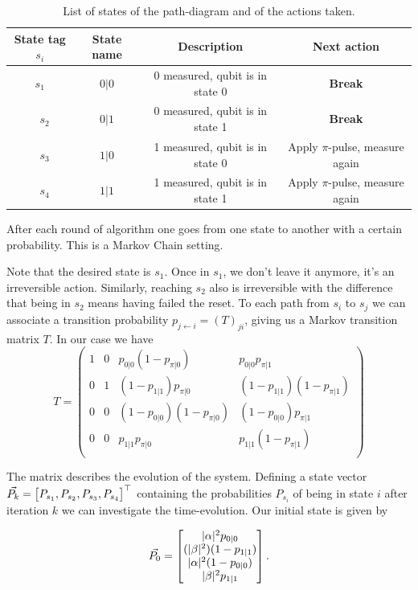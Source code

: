  \begin{table}[h]
     \centering
     \begin{tabular}{c|c|c|c}
        State tag $s_i$ & State name & Description & Next action \\ \hline 
        $s_1$ & $0|0$  & 0 measured, qubit is in state 0 & \textbf{Break}\\ 
        $s_2$ & $0|1$  & 0 measured, qubit is in state 1 & \textbf{Break}\\ 
        $s_3$ & $1|0$  & 1 measured, qubit is in state 0 & Apply $\pi$-pulse, measure again\\ 
        $s_4$ & $1|1$  & 1 measured, qubit is in state 1 & Apply $\pi$-pulse, measure again
     \end{tabular}
     \caption{List of states of the path-diagram and of the actions taken.}
     \label{tab:states_branching1}
 \end{table}

After each round of algorithm one goes from one state to another with a certain probability. This is a Markov Chain setting. 

Note that the desired state is $s_1$. Once in $s_1$, we don't leave it anymore, it's an irreversible action. Similarly, reaching $s_2$ also is irreversible with the difference that being in $s_2$ means having failed the reset. To each path from $s_i$ to $s_j$ we can associate a transition probability $p_{j\leftarrow i} = (T)_{ji}$, giving us a Markov transition matrix $T$. In our case we have 
\begin{equation}
    T = \left(
\begin{array}{cccc}
 1 & 0 & {p_{0|0}} (1-{p_{\pi|0}}) & {p_{0|0}} {p_{\pi|1}} \\
 0 & 1 & (1-{p_{1|1}}) {p_{\pi|0}} & (1-{p_{1|1}}) (1-{p_{\pi|1}}) \\
 0 & 0 & (1-{p_{0|0}}) (1-{p_{\pi|0}}) & (1-{p_{0|0}}) {p_{\pi|1}} \\
 0 & 0 & {p_{1|1}} p_{\pi|0} & {p_{1|1}} (1-{p_{\pi|1}}) \\
\end{array}
\right)
\end{equation}

The matrix describes the evolution of the system. Defining a state vector $\Vec{P_k} = \begin{bmatrix}P_{s_1}, P_{s_2}, P_{s_3}, P_{s_4}\end{bmatrix}^\top$ containing the probabilities $P_{s_i}$ of being in state $i$ after iteration $k$ we can investigate the time-evolution. Our initial state is given by 

\begin{equation}
    \Vec{P_0} = \begin{bmatrix}\lvert \alpha \rvert^2 p_{0|0}\\(\lvert \beta \rvert^2) (1 - p_{1|1})\\\lvert \alpha \rvert^2(1- p_{0|0})\\\lvert \beta \rvert^2 p_{1|1}\end{bmatrix}. \label{eq:Pk}
\end{equation}

